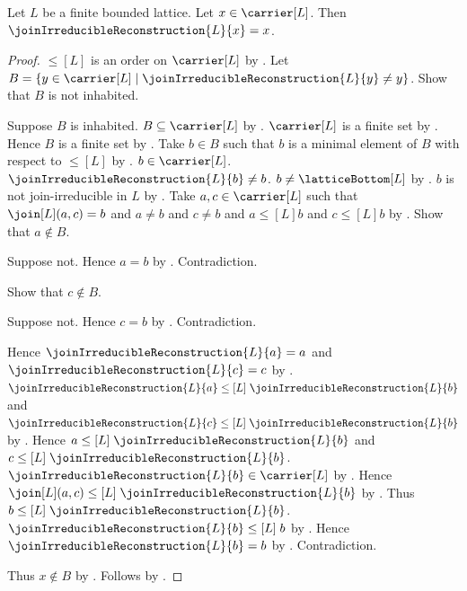 \begin{theorem}\label{finite_join_irreducible_decomposition}
    Let $L$ be a finite bounded lattice.
    Let $x\in\carrier[L]$.
    Then $\joinIrreducibleReconstruction{L}{x}=x$.
\end{theorem}
\begin{proof}
    $\leq[L]$ is an order on $\carrier[L]$ by
        .
    Let $B=\{y\in\carrier[L]\mid
        \joinIrreducibleReconstruction{L}{y}\neq y\}$.
    Show that $B$ is not inhabited.
    \begin{subproof}
        Suppose $B$ is inhabited.
        $B\subseteq\carrier[L]$ by .
        $\carrier[L]$ is a finite set by .
        Hence $B$ is a finite set by .
        Take $b\in B$ such that
            $b$ is a minimal element of $B$ with respect to $\leq[L]$ by
            .
        $b\in\carrier[L]$.
        $\joinIrreducibleReconstruction{L}{b}\neq b$.
        $b\neq\latticeBottom[L]$ by
            .
        $b$ is not join-irreducible in $L$ by
            .
        Take $a,c\in\carrier[L]$ such that
            $\join[L](a,c)=b$ and $a\neq b$ and $c\neq b$ and
            $a\mathrel{\leq[L]}b$ and $c\mathrel{\leq[L]}b$ by
            .
        Show that $a\notin B$.
        \begin{subproof}
            Suppose not.
            Hence $a=b$ by .
            Contradiction.
        \end{subproof}
        Show that $c\notin B$.
        \begin{subproof}
            Suppose not.
            Hence $c=b$ by .
            Contradiction.
        \end{subproof}
        Hence $\joinIrreducibleReconstruction{L}{a}=a$ and
            $\joinIrreducibleReconstruction{L}{c}=c$ by \auto.
        $\joinIrreducibleReconstruction{L}{a}
            \mathrel{\leq[L]}\joinIrreducibleReconstruction{L}{b}$ and
            $\joinIrreducibleReconstruction{L}{c}
            \mathrel{\leq[L]}\joinIrreducibleReconstruction{L}{b}$ by
            .
        Hence $a\mathrel{\leq[L]}\joinIrreducibleReconstruction{L}{b}$ and
            $c\mathrel{\leq[L]}\joinIrreducibleReconstruction{L}{b}$.
        $\joinIrreducibleReconstruction{L}{b}\in\carrier[L]$ by
            .
        Hence $\join[L](a,c)
            \mathrel{\leq[L]}\joinIrreducibleReconstruction{L}{b}$ by
            .
        Thus $b\mathrel{\leq[L]}\joinIrreducibleReconstruction{L}{b}$.
        $\joinIrreducibleReconstruction{L}{b}\mathrel{\leq[L]}b$ by
            .
        Hence $\joinIrreducibleReconstruction{L}{b}=b$ by
            .
        Contradiction.
    \end{subproof}
    Thus $x\notin B$ by \auto.
    Follows by \auto.
\end{proof}

